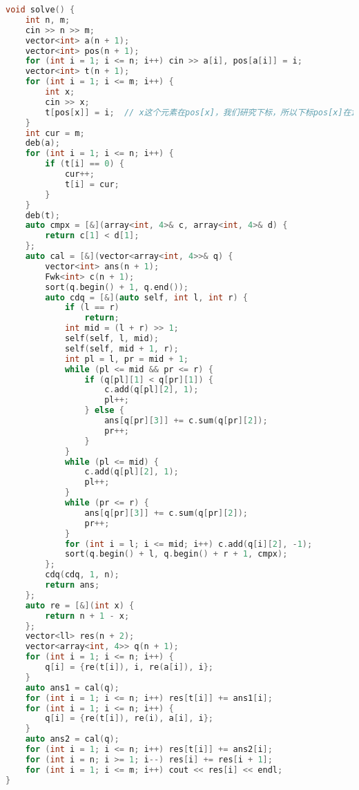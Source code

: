 \begin{lstlisting}[language=C++]
void solve() {
    int n, m;
    cin >> n >> m;
    vector<int> a(n + 1);
    vector<int> pos(n + 1);
    for (int i = 1; i <= n; i++) cin >> a[i], pos[a[i]] = i;
    vector<int> t(n + 1);
    for (int i = 1; i <= m; i++) {
        int x;
        cin >> x;
        t[pos[x]] = i;  // x这个元素在pos[x]，我们研究下标，所以下标pos[x]在i时刻被删除
    }
    int cur = m;
    deb(a);
    for (int i = 1; i <= n; i++) {
        if (t[i] == 0) {
            cur++;
            t[i] = cur;
        }
    }
    deb(t);
    auto cmpx = [&](array<int, 4>& c, array<int, 4>& d) {
        return c[1] < d[1];
    };
    auto cal = [&](vector<array<int, 4>>& q) {
        vector<int> ans(n + 1);
        Fwk<int> c(n + 1);
        sort(q.begin() + 1, q.end());
        auto cdq = [&](auto self, int l, int r) {
            if (l == r)
                return;
            int mid = (l + r) >> 1;
            self(self, l, mid);
            self(self, mid + 1, r);
            int pl = l, pr = mid + 1;
            while (pl <= mid && pr <= r) {
                if (q[pl][1] < q[pr][1]) {
                    c.add(q[pl][2], 1);
                    pl++;
                } else {
                    ans[q[pr][3]] += c.sum(q[pr][2]);
                    pr++;
                }
            }
            while (pl <= mid) {
                c.add(q[pl][2], 1);
                pl++;
            }
            while (pr <= r) {
                ans[q[pr][3]] += c.sum(q[pr][2]);
                pr++;
            }
            for (int i = l; i <= mid; i++) c.add(q[i][2], -1);
            sort(q.begin() + l, q.begin() + r + 1, cmpx);
        };
        cdq(cdq, 1, n);
        return ans;
    };
    auto re = [&](int x) {
        return n + 1 - x;
    };
    vector<ll> res(n + 2);
    vector<array<int, 4>> q(n + 1);
    for (int i = 1; i <= n; i++) {
        q[i] = {re(t[i]), i, re(a[i]), i};
    }
    auto ans1 = cal(q);
    for (int i = 1; i <= n; i++) res[t[i]] += ans1[i];
    for (int i = 1; i <= n; i++) {
        q[i] = {re(t[i]), re(i), a[i], i};
    }
    auto ans2 = cal(q);
    for (int i = 1; i <= n; i++) res[t[i]] += ans2[i];
    for (int i = n; i >= 1; i--) res[i] += res[i + 1];
    for (int i = 1; i <= m; i++) cout << res[i] << endl;
}
\end{lstlisting}
